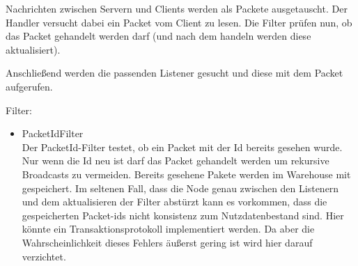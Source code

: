 Nachrichten zwischen Servern und Clients werden als Packete ausgetauscht. Der Handler versucht dabei ein Packet vom Client zu lesen. Die Filter prüfen nun, ob das Packet gehandelt werden darf (und nach dem handeln werden diese aktualisiert).

Anschließend werden die passenden Listener gesucht und diese mit dem Packet aufgerufen.




Filter:
\begin{itemize}
    \item PacketIdFilter\\
        Der PacketId-Filter testet, ob ein Packet mit der Id bereits gesehen wurde. Nur wenn die Id neu ist darf das Packet gehandelt werden um rekursive Broadcasts zu vermeiden. Bereits gesehene Pakete werden im Warehouse mit gespeichert. Im seltenen Fall, dass die Node genau zwischen den Listenern und dem aktualisieren der Filter abstürzt kann es vorkommen, dass die gespeicherten Packet-ids nicht konsistenz zum Nutzdatenbestand sind. Hier könnte ein Transaktionsprotokoll implementiert werden. Da aber die Wahrscheinlichkeit dieses Fehlers äußerst gering ist wird hier darauf verzichtet.
        
\end{itemize}



